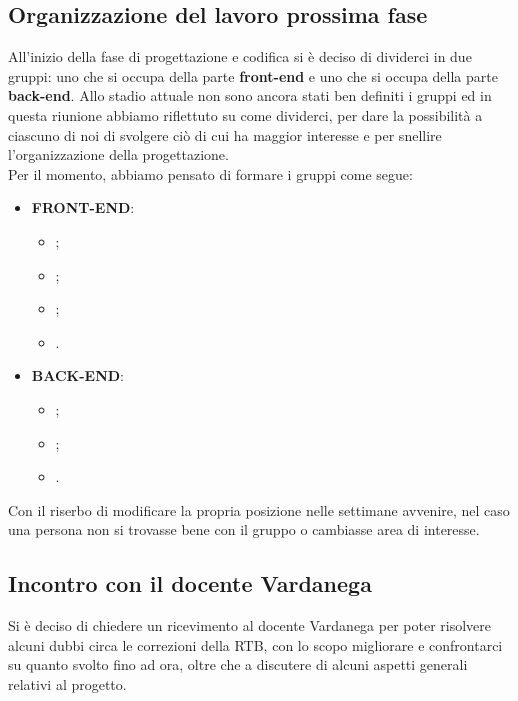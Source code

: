 \subsection{Organizzazione del lavoro prossima fase} 
All'inizio della fase di progettazione e codifica si è deciso di dividerci in due gruppi: uno che si occupa della parte \textbf{front-end} e uno che si occupa della parte \textbf{back-end}. Allo stadio attuale non sono ancora stati ben definiti i gruppi ed in questa riunione abbiamo riflettuto su come dividerci, per dare la possibilità a ciascuno di noi di svolgere ciò di cui ha maggior interesse e per snellire l'organizzazione della progettazione. \\
Per il momento, abbiamo pensato di formare i gruppi come segue:
\begin{itemize}
	\item \textbf{FRONT-END}:
		\begin{itemize}
			\item {\EP{};}
			\item {\GC{};}
			\item {\LW{};}
			\item {\PV{}.}
		\end{itemize}
	\item \textbf{BACK-END}:
		\begin{itemize}
			\item {\FP{};}
			\item {\MB{};}
			\item {\MG{}.}
		\end{itemize}
\end{itemize}
Con il riserbo di modificare la propria posizione nelle settimane avvenire, nel caso una persona non si trovasse bene con il gruppo o cambiasse area di interesse.  
 
\subsection{Incontro con il docente Vardanega}
Si è deciso di chiedere un ricevimento al docente Vardanega per poter risolvere alcuni dubbi circa le correzioni della RTB, con lo scopo migliorare e confrontarci su quanto svolto fino ad ora, oltre che a discutere di alcuni aspetti generali relativi al progetto.